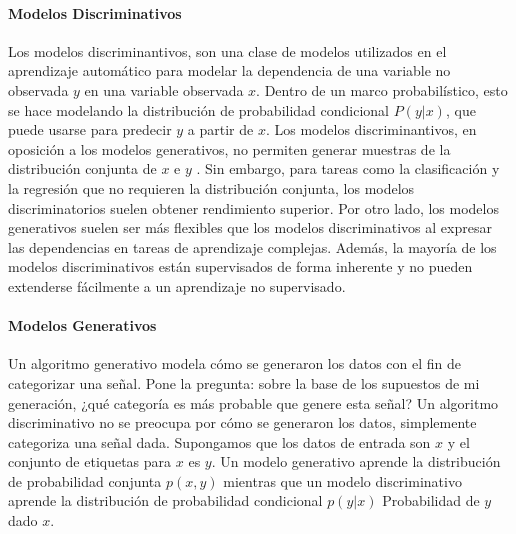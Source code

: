 \documentclass[a4paper,11pt,spanish]{book}
\begin{document}
	\paragraph{Modelos Discriminativos}
	  Los modelos discriminantivos, son una clase de modelos utilizados en el aprendizaje automático para modelar la dependencia de una variable no observada $y$  en una variable observada $x$. 
	  Dentro de un marco probabilístico, esto se hace modelando la distribución de probabilidad condicional $P (y | x)$, que puede usarse para predecir $y$ a partir de  $x$.
	  Los modelos discriminantivos, en oposición a los modelos generativos, no permiten generar muestras de la distribución conjunta de $x$ e $y$ . 
	  Sin embargo, para tareas como la clasificación y la regresión que no requieren la distribución conjunta, los modelos discriminatorios suelen obtener rendimiento superior.  
	  Por otro lado, los modelos generativos suelen ser más flexibles que los modelos discriminativos al expresar las dependencias en tareas de aprendizaje complejas. 
	  Además, la mayoría de los modelos discriminativos están supervisados ​​de forma inherente y no pueden extenderse fácilmente a un aprendizaje no supervisado.
	
	\paragraph{Modelos Generativos}
	  Un algoritmo generativo modela cómo se generaron los datos con el fin de categorizar una señal. Pone la pregunta: sobre la base de los supuestos de mi generación, 
	  ¿qué categoría es más probable que genere esta señal? Un algoritmo discriminativo no se preocupa por cómo se generaron los datos, simplemente categoriza una señal dada.
	  Supongamos que los datos de entrada son $x$ y el conjunto de etiquetas para $x$ es $y$. Un modelo generativo aprende la distribución de probabilidad conjunta 
	  $p (x, y)$  mientras que un modelo discriminativo aprende la distribución de probabilidad condicional  $p (y | x)$ Probabilidad de $y$ dado $x$.
	
\end{document}

